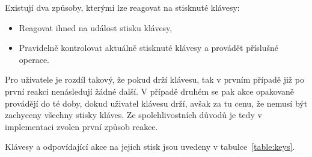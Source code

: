 Existují dva způsoby, kterými lze reagovat na stisknuté klávesy: 
\begin{itemize}
\item Reagovat ihned na událost stisku klávesy,
\item Pravidelně kontrolovat aktuálně stisknuté klávesy a provádět příslušné operace.
\end{itemize}   

Pro uživatele je rozdíl takový, že pokud drží klávesu, tak v prvním případě již po první reakci nenásledují žádné další. V případě druhém se pak akce opakovaně provádějí do té doby, dokud uživatel klávesu drží, avšak za tu cenu, že nemusí být zachyceny všechny stisky kláves. Ze spolehlivostních důvodů je tedy v implementaci zvolen první způsob reakce. 

Klávesy a odpovídající akce na jejich stisk jsou uvedeny v tabulce~\ref{table:keys}.

